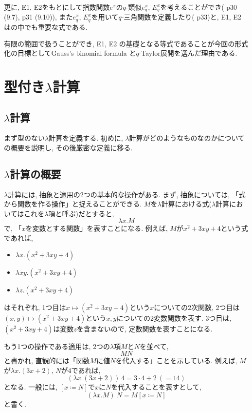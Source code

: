 \documentclass[11pt]{jsreport}
\theoremstyle{mystyle}
\newcommand{\0}{\textbf{0}}
\newcommand{\1}{\textbf{1}}
\newcommand{\2}{\textbf{2}}
\begin{document}
更に, E1, E2をもとにして指数関数$e^x$の$q$-類似$e^x_q$, $E^x_q$を考えることができ(\cite{Kac} p30 (9.7), p31 (9.10)), 
また$e^x_q$, $E^x_q$を用いて$q$-三角関数を定義したり(\cite{Kac} p33)と, E1, E2 は\cite{Kac}の中でも重要な式である. 

有限の範囲で扱うことができ,  E1, E2 の基礎となる等式であることが今回の形式化の目標としてGauss's binomial formula と$q$-Taylor展開を選んだ理由である. 
\section{型付き$\lambda$計算} \label{sec lambda}
\subsection{$\lambda$計算} \label{ssec lambdacal}
まず型のない$\lambda$計算を定義する. 初めに, $\lambda$計算がどのようなものなのかについての概要を説明し, その後厳密な定義に移る.

\subsection*{$\lambda$計算の概要}
$\lambda$計算には, 抽象と適用の2つの基本的な操作がある. まず, 抽象については, 「式から関数を作る操作」と捉えることができる. $M$を$\lambda$計算における式($\lambda$計算においてはこれを$\lambda$項と呼ぶ)だとすると, 
\[
  \lambda x . M
\]
で, 「$x$を変数とする関数」を表すことになる. 
例えば, $M$が$x^2 + 3xy + 4$という式であれば, 
\begin{itemize}
  \item $\lambda x . (x^2 + 3xy + 4)$
  \item $\lambda xy . (x^2 + 3xy + 4)$
  \item $\lambda z . (x^2 + 3xy + 4)$
\end{itemize}
はそれぞれ, 1つ目は$x \mapsto (x^2 + 3xy + 4)$という$x$についての2次関数, 
2つ目は$(x, y) \mapsto (x^2 + 3xy + 4)$という$x, y$についての2変数関数を表す. 
3つ目は, $(x^2 + 3xy + 4)$は変数$z$を含まないので, 定数関数を表すことになる.

もう1つの操作である適用は, 2つの$\lambda$項$M$と$N$を並べて, 
\[
  MN
\]
と書かれ, 直観的には「関数$M$に値$N$を代入する」ことを示している. 
例えば, $M$が$\lambda x . (3x + 2)$, $N$が$4$であれば, 
\[
  (\lambda x . (3x + 2))\ 4 = 3 \cdot 4 + 2\ (= 14)
\]
となる. 一般には, $[x \coloneqq N]$で$x$に$N$を代入することを表すとして, 
\[
  (\lambda x. M)\ N = M[x\coloneqq N]
\]
と書く. 
\end{document}
